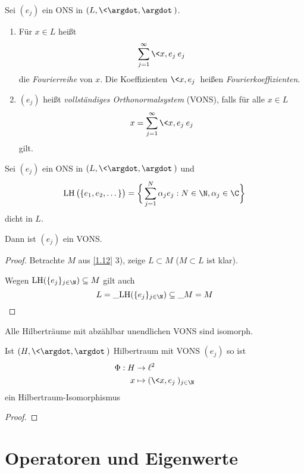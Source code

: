 \begin{df} \label{1.14}
	Sei $(e_j)$ ein ONS in $(L, \<\argdot,\argdot\>)$.
	\begin{enumerate}[1)]
		\item
			Für $x\in L$ heißt
			\[
				\sum_{j=1}^\infty \<x,e_j\> e_j
			\]
			die \emph{Fourierreihe} von $x$.
			Die Koeffizienten $\<x,e_j\>$ heißen \emph{Fourierkoeffizienten}.
		\item
			$(e_j)$ heißt \emph{vollständiges Orthonormalsystem} (VONS), falls für alle $ x\in L $
			\[
				x = \sum_{j=1}^\infty \<x,e_j\> e_j
			\]
			gilt.
	\end{enumerate}
\end{df}

\begin{nt} \label{1.15}
	Sei $(e_j)$ ein ONS in $(L, \<\argdot,\argdot\>)$ und
	\[
		\LH\big(\{e_1,e_2,\dotsc\}\big) = \bigg\{ \sum_{j=1}^N \alpha_j e_j : N \in \N, \alpha_j \in \C \bigg\}
	\]
	dicht in $L$.

	Dann ist $(e_j)$ ein VONS.
	\begin{proof}
		Betrachte $M$ aus \ref{1.12} 3), zeige $L \subset M$ ($M \subset L$ ist klar).

		Wegen $\LH(\{e_j\}_{j\in \N}) \subset M$ gilt auch
		\[
			L = \_{\LH(\{e_j\}_{j\in \N})} \subset \_{M} = M
		\]
	\end{proof}
\end{nt}

\begin{st} \label{1.16}
	Alle Hilberträume mit abzählbar unendlichen VONS sind isomorph.

	Ist $(H,\<\argdot, \argdot\>)$ Hilbertraum mit VONS $(e_j)$ so ist
	\begin{align*}
		\Phi: H &\to \ell^2 \\
		x &\mapsto (\<x,e_j\>)_{j\in \N}
	\end{align*}
	ein Hilbertraum-Isomorphismus
	\begin{proof}
	\end{proof}
\end{st}



\section{Operatoren und Eigenwerte}



